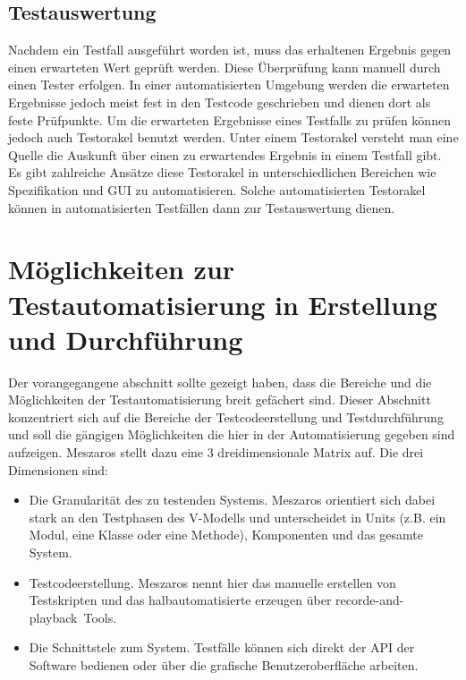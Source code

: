 \subsection{Testauswertung}
\label{subsec:testauswertung}
Nachdem ein Testfall ausgeführt worden ist, muss das erhaltenen Ergebnis gegen einen erwarteten Wert geprüft werden.
Diese Überprüfung kann manuell durch einen Tester erfolgen. 
In einer automatisierten Umgebung werden die erwarteten Ergebnisse jedoch meist fest in den Testcode geschrieben und dienen dort als feste Prüfpunkte.
Um die erwarteten Ergebnisse eines Testfalls zu prüfen können jedoch auch Testorakel benutzt werden. Unter einem Testorakel versteht man eine Quelle die Auskunft über einen zu erwartendes Ergebnis in einem Testfall gibt. Es gibt zahlreiche Ansätze diese Testorakel in unterschiedlichen Bereichen wie Spezifikation und GUI zu automatisieren. \cite{memon_automated_2000} \cite{richardson_specification-based_1992}
\cite{shahamiri_comparative_2009} Solche automatisierten Testorakel können in automatisierten Testfällen dann zur Testauswertung dienen.


\section{Möglichkeiten zur Testautomatisierung in Erstellung und Durchführung}
\label{sec:möglichkeiten_zur_testautomatisierung_in_erstellung_und_durchführung}
Der vorangegangene abschnitt sollte gezeigt haben, dass die Bereiche und die Möglichkeiten der Testautomatisierung breit gefächert sind. Dieser Abschnitt konzentriert sich auf die Bereiche der Testcodeerstellung und Testdurchführung und soll die gängigen Möglichkeiten die hier in der Automatisierung gegeben sind aufzeigen. Meszaros \cite{meszaros_agile_2003} stellt dazu eine 3 dreidimensionale Matrix auf.
Die drei Dimensionen sind:

\begin{itemize}
	  \itemsep0pt
      \item Die Granularität des zu testenden Systems. Meszaros orientiert sich dabei stark an den Testphasen des V-Modells und unterscheidet in Units (z.B. ein Modul, eine Klasse oder eine Methode), Komponenten und das gesamte System.
      \item Testcodeerstellung. Meszaros nennt hier das manuelle erstellen von Testskripten und das halbautomatisierte erzeugen über \glqq recorde-and-playback\grqq\ Tools. 
      \item Die Schnittstele zum System. Testfälle können sich direkt der API der Software bedienen oder über die grafische Benutzeroberfläche arbeiten.
\end{itemize}

